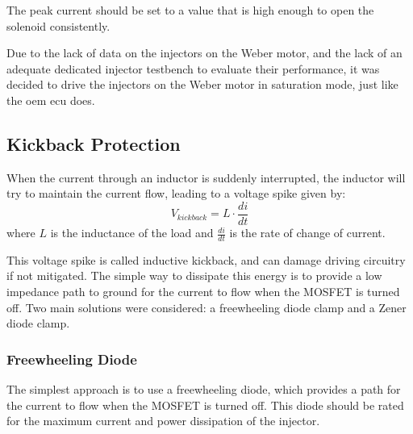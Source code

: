             The peak current should be set to a value that is high enough to open the solenoid consistently.

            Due to the lack of data on the injectors on the Weber motor, and the lack of an adequate dedicated injector testbench to evaluate their performance, it was decided to drive the injectors on the Weber motor in saturation mode, just like the \gls{oem} \gls{ecu} does.


        \subsection{Kickback Protection}

            When the current through an inductor is suddenly interrupted, the inductor will try to maintain the current flow, leading to a voltage spike given by:
            \begin{equation}
                V_{kickback} = L \cdot \frac{di}{dt}
            \end{equation}
            where \(L\) is the inductance of the load and \(\frac{di}{dt}\) is the rate of change of current.

            This voltage spike is called inductive kickback, and can damage driving circuitry if not mitigated. The simple way to dissipate this energy is to provide a low impedance path to ground for the current to flow when the MOSFET is turned off. Two main solutions were considered: a freewheeling diode clamp and a Zener diode clamp.


            \subsubsection{Freewheeling Diode}

                The simplest approach is to use a freewheeling diode, which provides a path for the current to flow when the MOSFET is turned off. This diode should be rated for the maximum current and power dissipation of the injector.

